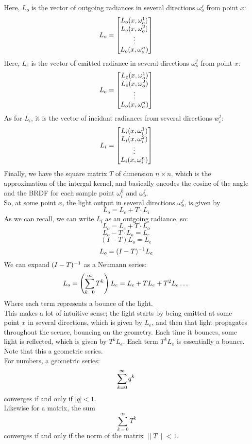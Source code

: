 \documentclass[12pt]{article}
\begin{document}
Here, $L_o$ is the vector of outgoing radiances 
in several directions $\omega_o^j$ from point $x$:
\[ L_o = \begin{bmatrix} L_o(x, \omega_o^1) \\ L_o(x, \omega_o^2) \\
\vdots \\ L_o(x, \omega_o^n) \end{bmatrix} \]
Here, $L_e$ is the vector of emitted radiance 
in several directions $\omega_o^j$ from point $x$:
\[ L_e = \begin{bmatrix} L_e(x, \omega_o^1) \\ L_e(x, \omega_o^2) \\
\vdots \\ L_o(x, \omega_o^n) \end{bmatrix} \]
As for $L_i$, it is the vector of incidant radiances
from several directions $w_i^j$:
\[ L_i = \begin{bmatrix} L_i(x, \omega_i^1) \\ L_i(x, \omega_i^2) \\
\vdots \\ L_i(x, \omega_i^n) \end{bmatrix} \]
Finally, we have the square matrix $T$ 
of dimension $n \times n$, which is the approximation
of the intergal kernel,
and basically encodes the cosine of the angle
and the BRDF for each sample point $\omega_i^k$
and $\omega_o^j$. \\

So, at some point $x$, the light output
in several directions $\omega_o^j$,
is given by 
\[ L_o = L_e + T \cdot L_i \]
As we can recall, we can write $L_i$
as an outgoing radiance, so:
\[ L_o = L_e + T \cdot L_o \]
\[ L_o - T \cdot L_o = L_e \]
\[ (I - T)L_o = L_e \]
\[ L_o = (I - T)^{-1} L_e \]
We can expand $(I - T)^{-1}$ as a Neumann series:
\[ L_o = \left( \sum_{k = 0}^{\infty} T^k \right) L_e
= L_e + TL_e + T^2L_e \dots \]
Where each term represents a bounce of the light. \\

This makes a lot of intuitive sense;
the light starts by being emitted at some point
$x$ in several directions, which is given by $L_e$,
and then that light propagates throughout the scence,
bouncing on the geometry. Each time it bounces,
some light is reflected, which is given by $T^k L_e$.
Each term $T^k L_e$ is essentially a bounce. \\
Note that this a geometric series. \\

For numbers, a geometric series:
\[ \sum_{k = 0}^{\infty} q^k \]
converges if and only if $|q| < 1$. \\

Likewise for a matrix, the sum
\[ \sum_{k = 0}^{\infty} T^k \]
converges if and only if the norm of the matrix
$\|T\| < 1$. \\
\end{document}
